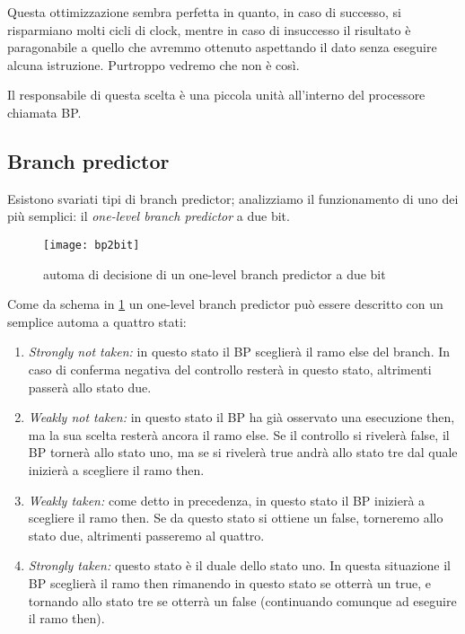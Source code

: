 		Questa ottimizzazione sembra perfetta in quanto, in caso di successo, si risparmiano molti cicli di clock, mentre in caso di insuccesso il risultato è paragonabile a quello che avremmo ottenuto aspettando il dato senza eseguire alcuna istruzione. Purtroppo vedremo che non è così.
		
		Il responsabile di questa scelta è una piccola unità all'interno del processore chiamata \ac{BP}.
		
		\subsection{Branch predictor}
			Esistono svariati tipi di branch predictor; analizziamo il funzionamento di uno dei più semplici: il \emph{one-level branch predictor} a due bit.
			
			\begin{figure}
				\begin{center}
					\texttt{[image: bp2bit]}
					\caption{automa di decisione di un one-level branch predictor a due bit}
					\label{fig:bp2bits}
				\end{center}
			\end{figure}
		
			Come da schema in \cref{fig:bp2bits} un one-level branch predictor può essere descritto con un semplice automa a quattro stati:
			
			\begin{enumerate}
				\item \emph{Strongly not taken:} in questo stato il \ac{BP} sceglierà il ramo else del branch. In caso di conferma negativa del controllo resterà in questo stato, altrimenti passerà allo stato due.
				\item \emph{Weakly not taken:} in questo stato il \ac{BP} ha già osservato una esecuzione then, ma la sua scelta resterà ancora il ramo else. Se il controllo si rivelerà false, il \ac{BP} tornerà allo stato uno, ma se si rivelerà true andrà allo stato tre dal quale inizierà a scegliere il ramo then.
				\item \emph{Weakly taken:} come detto in precedenza, in questo stato il \ac{BP} inizierà a scegliere il ramo then. Se da questo stato si ottiene un false, torneremo allo stato due, altrimenti passeremo al quattro.
				\item \emph{Strongly taken:} questo stato è il duale dello stato uno. In questa situazione il \ac{BP} sceglierà il ramo then rimanendo in questo stato se otterrà un true, e tornando allo stato tre se otterrà un false (continuando comunque ad eseguire il ramo then).
			\end{enumerate}
		
